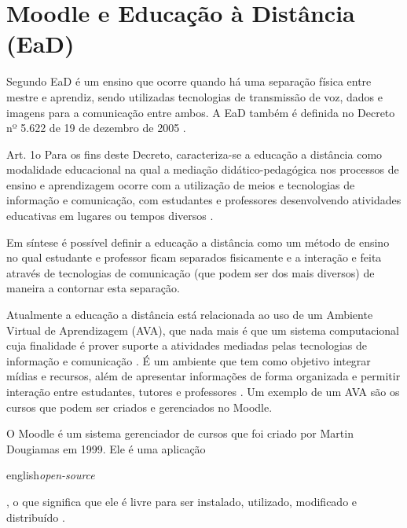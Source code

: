 \documentclass[
	12pt,				%
	openright,			%
	oneside,			%
	a4paper,			%
	english,			%
	french,				%
	spanish,			%
	brazil				%
	]{abntex2}
\begin{document}
\section{Moodle e Educação à Distância (EaD)}\label{cap-ead}

Segundo  EaD é um ensino que ocorre quando há uma separação física entre mestre e aprendiz, sendo utilizadas tecnologias de transmissão de voz, dados e imagens para a comunicação entre ambos. A EaD também é definida no Decreto nº 5.622 de 19 de dezembro de 2005 \cite{BRASIL2005}.
 \begin{citacao}
 	Art. 1o  Para os fins deste Decreto, caracteriza-se a educação a distância como modalidade educacional na qual a mediação didático-pedagógica nos processos de ensino e aprendizagem ocorre com a utilização de meios e tecnologias de informação e comunicação, com estudantes e professores desenvolvendo atividades educativas em lugares ou tempos diversos \cite{BRASIL2005}.
 \end{citacao}
 
Em síntese é possível definir a educação a distância como um método de ensino no qual estudante e professor ficam separados fisicamente e a interação e feita através de tecnologias de comunicação (que podem ser dos mais diversos) de maneira a contornar esta separação.

Atualmente a educação a distância está relacionada ao uso de um Ambiente Virtual de Aprendizagem (AVA), que nada mais é que um sistema computacional cuja finalidade é prover suporte a atividades mediadas pelas tecnologias de informação e comunicação \cite{Almeida2010}. É um ambiente que tem como objetivo integrar mídias e recursos, além de apresentar informações de forma organizada e permitir interação entre estudantes, tutores e professores \cite{Franciscato2008}. Um exemplo de um AVA são os cursos que podem ser criados e gerenciados no Moodle.
   
O Moodle é um sistema gerenciador de cursos que foi criado por Martin Dougiamas em 1999. Ele é uma aplicação \begin{otherlanguage*}{english}\textit{open-source}\end{otherlanguage*}, o que significa que ele é livre para ser instalado, utilizado, modificado e distribuído \cite{Dougiamas2003}. 
\end{document}
